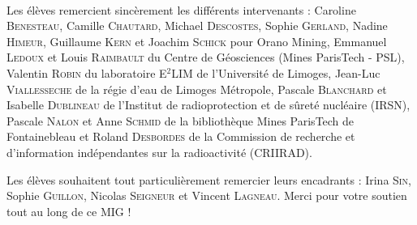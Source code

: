 \documentclass{article}
\begin{document}
\paragraph{} Les élèves remercient sincèrement les différents intervenants : Caroline \textsc{Benesteau}, Camille \textsc{Chautard}, Michael \textsc{Descostes}, Sophie \textsc{Gerland}, Nadine \textsc{Himeur}, Guillaume \textsc{Kern} et Joachim \textsc{Schick} pour Orano Mining, Emmanuel \textsc{Ledoux} et Louis \textsc{Raimbault} du Centre de Géosciences (Mines ParisTech - PSL), Valentin \textsc{Robin} du laboratoire E$^2$LIM de l'Université de Limoges, Jean-Luc \textsc{Viallesseche} de la régie d'eau de Limoges Métropole, Pascale \textsc{Blanchard} et Isabelle \textsc{Dublineau} de l'Institut de radioprotection et de sûreté nucléaire (IRSN), Pascale \textsc{Nalon} et Anne \textsc{Schmid} de la bibliothèque Mines ParisTech de Fontainebleau et Roland \textsc{Desbordes} de la Commission de recherche et d'information indépendantes sur la radioactivité (CRIIRAD).


Les élèves souhaitent tout particulièrement remercier leurs encadrants : Irina \textsc{Sin}, Sophie \textsc{Guillon}, Nicolas \textsc{Seigneur} et Vincent \textsc{Lagneau}. Merci pour votre soutien tout au long de ce MIG !
\end{document}
